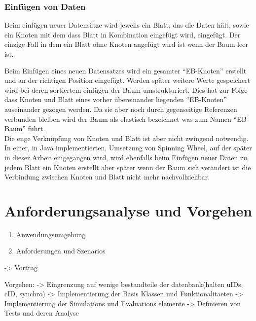 \documentclass[a4paper,11pt,oneside,%
headsepline,												%
footsepline,												%
bibtotocnumbered									%
]{scrreprt}
\begin{document}
\subsection{Einfügen von Daten}
Beim einfügen neuer Datensätze wird jeweils ein Blatt, das die Daten hält, sowie ein Knoten mit dem dass Blatt in Kombination eingefügt wird, eingefügt. Der einzige Fall in dem ein Blatt ohne Knoten angefügt wird ist wenn der Baum leer ist.

Beim Einfügen eines neuen Datensatzes wird ein gesamter \enquote{EB-Knoten} erstellt und an der richtigen Position eingefügt. Werden später weitere Werte gespeichert wird bei deren sortiertem einfügen der Baum umstrukturiert. Dies hat zur Folge dass Knoten und Blatt eines vorher übereinander liegenden \enquote{EB-Knoten} auseinander gezogen werden. Da sie aber noch durch gegenseitige Referenzen verbunden bleiben wird der Baum als elastisch bezeichnet was zum Namen \enquote{\ac{EB-Baum}} führt.\\
Die enge Verknüpfung von Knoten und Blatt ist aber nicht zwingend notwendig. In einer, in Java implementierten, Umsetzung von Spinning Wheel, auf der später in dieser Arbeit eingegangen wird, wird ebenfalls beim Einfügen neuer Daten zu jedem Blatt ein Knoten erstellt aber später wenn der Baum sich verändert ist die Verbindung zwischen Knoten und Blatt nicht mehr nachvollziehbar.


 
\chapter{Anforderungsanalyse und Vorgehen}
\begin{enumerate}[1.]
			\item Anwendungsumgebung
			\item Anforderungen und Szenarios
		\end{enumerate}
-> Vortrag

Vorgehen:
-> Eingrenzung auf wenige bestandteile der datenbank(halten uIDs, cID, synchro)
-> Implementierung der Basis Klassen und Funktionalitaeten 
-> Implementierung der Simulations und Evaluations elemente
-> Definieren von Tests und deren Analyse
\end{document}
